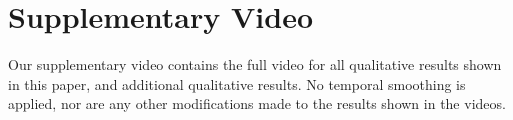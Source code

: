 

\section{Supplementary Video}

Our supplementary video contains the full video for all qualitative results shown in this paper, and additional qualitative results. No temporal smoothing is applied, nor are any other modifications made to the results shown in the videos.